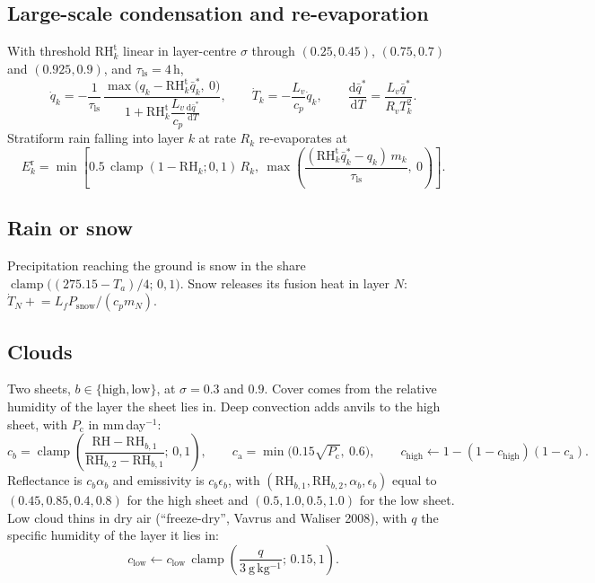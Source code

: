 \documentclass[11pt,a4paper]{article}
\newcommand{\dd}{\mathrm{d}}
\newcommand{\dv}[2]{\frac{\dd #1}{\dd #2}}
\newcommand{\clamp}{\operatorname{clamp}}
\begin{document}
\subsection{Large-scale condensation and re-evaporation}
With threshold $\mathrm{RH}^{\mathrm{t}}_k$ linear in layer-centre $\sigma$ through
$(0.25, 0.45)$, $(0.75, 0.7)$ and $(0.925, 0.9)$, and $\tau_{\mathrm{ls}} = 4$\,h,
\begin{equation}
\dot q_k = -\frac{1}{\tau_{\mathrm{ls}}}\,
  \frac{\max\bigl(q_k - \mathrm{RH}^{\mathrm{t}}_k\bar q^*_k,\ 0\bigr)}
       {1 + \mathrm{RH}^{\mathrm{t}}_k\dfrac{L_v}{c_p}\dv{\bar q^*}{T}}, \qquad
\dot T_k = -\frac{L_v}{c_p}\dot q_k, \qquad
\dv{\bar q^*}{T} = \frac{L_v\bar q^*}{R_v T_k^2}.
\end{equation}
Stratiform rain falling into layer $k$ at rate $R_k$ re-evaporates at
\begin{equation}
E^{\mathrm{r}}_k = \min\!\left[0.5\,\clamp(1-\mathrm{RH}_k; 0,1)\,R_k,\
  \max\!\left(\frac{(\mathrm{RH}^{\mathrm{t}}_k\bar q^*_k - q_k)\,m_k}{\tau_{\mathrm{ls}}},\ 0\right)\right].
\end{equation}

\subsection{Rain or snow}
Precipitation reaching the ground is snow in the share
$\clamp\bigl((275.15 - T_a)/4;\,0,1\bigr)$. Snow releases its fusion heat in layer
$N$: $\dot T_N \mathrel{+}= L_f P_{\mathrm{snow}}/(c_p m_N)$.

\subsection{Clouds}
Two sheets, $b \in \{\text{high}, \text{low}\}$, at $\sigma = 0.3$ and $0.9$. Cover
comes from the relative humidity of the layer the sheet lies in. Deep convection
adds anvils to the high sheet, with $P_{\mathrm{c}}$ in mm\,day$^{-1}$:
\begin{equation}
c_b = \clamp\!\left(\frac{\mathrm{RH} - \mathrm{RH}_{b,1}}{\mathrm{RH}_{b,2} - \mathrm{RH}_{b,1}};\,0,1\right),
\qquad
c_{\mathrm{a}} = \min\bigl(0.15\sqrt{P_{\mathrm{c}}},\ 0.6\bigr),
\qquad
c_{\mathrm{high}} \leftarrow 1 - (1-c_{\mathrm{high}})(1-c_{\mathrm{a}}) .
\end{equation}
Reflectance is $c_b\alpha_b$ and emissivity is $c_b\epsilon_b$, with
$(\mathrm{RH}_{b,1}, \mathrm{RH}_{b,2}, \alpha_b, \epsilon_b)$ equal to
$(0.45, 0.85, 0.4, 0.8)$ for the high sheet and $(0.5, 1.0, 0.5, 1.0)$ for the low
sheet. Low cloud thins in dry air (``freeze-dry'', Vavrus and Waliser 2008), with
$q$ the specific humidity of the layer it lies in:
\begin{equation}
c_{\mathrm{low}} \leftarrow c_{\mathrm{low}}\,
\clamp\!\left(\frac{q}{3\ \mathrm{g\,kg^{-1}}};\,0.15,1\right).
\end{equation}
\end{document}
